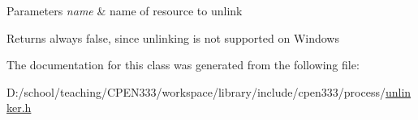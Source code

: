 \begin{DoxyParams}{Parameters}
{\em name} & name of resource to unlink \\
\hline
\end{DoxyParams}
\begin{DoxyReturn}{Returns}
always {\ttfamily false}, since unlinking is not supported on Windows 
\end{DoxyReturn}


The documentation for this class was generated from the following file\+:\begin{DoxyCompactItemize}
\item 
D\+:/school/teaching/\+C\+P\+E\+N333/workspace/library/include/cpen333/process/\hyperlink{unlinker_8h}{unlinker.\+h}\end{DoxyCompactItemize}
